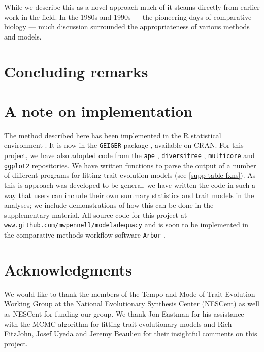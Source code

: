 \documentclass[12pt]{article}
\begin{document}
While we describe this as a novel approach much of it steams directly from earlier work in the field. In the 1980s and 1990s --- the pioneering days of comparative biology --- much discussion surrounded the appropriateness of various methods and models.
\section{Concluding remarks}




\section{A note on implementation}

The method described here has been implemented in the R statistical environment \citep{R}. It is now in the \texttt{GEIGER} package \citep{geiger}, available on CRAN. For this project, we have also adopted code from the \texttt{ape} \citep{ape}, \texttt{diversitree} \citep{FitzJohn2012}, \texttt{multicore} \citep{multicore} and \texttt{ggplot2} \citep{ggplot2} repositories. We have written functions to parse the output of a number of different programs for fitting trait evolution models (see \ref{supp-table-fxns}). As this is approach was developed to be general, we have written the code in such a way that users can include their own summary statistics and trait models in the analyses; we include demonstrations of how this can be done in the supplementary material. All source code for this project at \texttt{www.github.com/mwpennell/modeladequacy} and is soon to be implemented in the comparative methods workflow software \texttt{Arbor} \citep{HarmonArbor}. 

\section{Acknowledgments}

We would like to thank the members of the Tempo and Mode of Trait Evolution Working Group at the National Evolutionary Synthesis Center (NESCent) as well as NESCent for funding our group. We thank Jon Eastman for his assistance with the MCMC algorithm for fitting trait evolutionary models and Rich FitzJohn, Josef Uyeda and Jeremy Beaulieu for their insightful comments on this project.



\newpage


\end{document}

